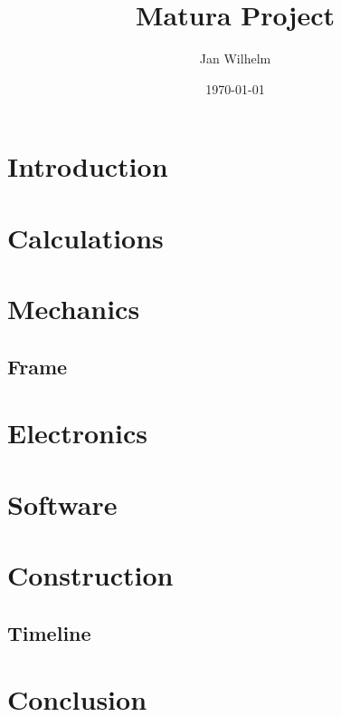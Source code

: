 \documentclass[11pt]{report}
\title{Matura Project}
\author{Jan Wilhelm}
\date\today
\begin{document}
    \maketitle

    \tableofcontents
    \newpage


    \chapter{Introduction}\label{ch:introduction}
    

    \chapter{Calculations}\label{ch:calculations}
    

    \chapter{Mechanics}\label{ch:mechanics}
    


    \section{Frame}\label{sec:frame}


    \chapter{Electronics}\label{ch:electronics}


    \chapter{Software}\label{ch:software}
    

    \chapter{Construction}\label{ch:construction}

    \section{Timeline}\label{sec:timeline}

    \chapter{Conclusion}\label{ch:conclusion}
\end{document}

